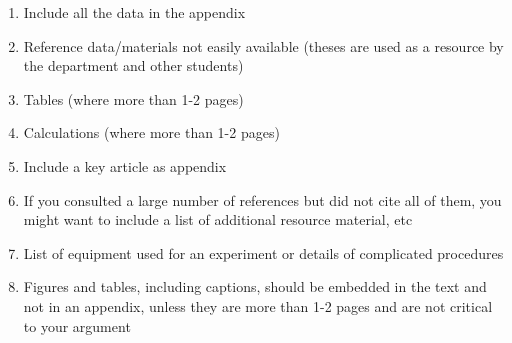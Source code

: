 \begin{enumerate}
    
    \item   Include all the data in the appendix
    \item   Reference data/materials not easily available (theses are used as a resource by the department and other students)
    \item   Tables (where more than 1-2 pages)
    \item   Calculations (where more than 1-2 pages)
    \item   Include a key article as appendix
    \item   If you consulted a large number of references but did not cite all of them, you might want to include a list of additional resource material, etc
    \item   List of equipment used for an experiment or details of complicated procedures
    \item   Figures and tables, including captions, should be embedded in the text and not in an appendix, unless they are more than 1-2 pages and are not critical to your argument

\end{enumerate}